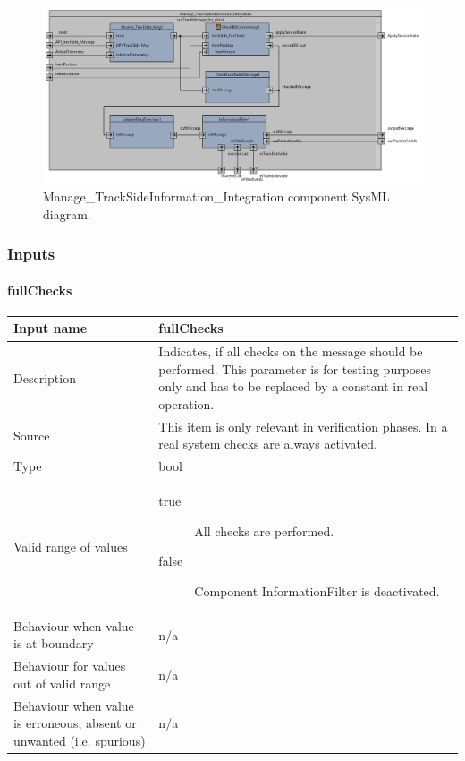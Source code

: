 \begin{figure}[H]
\center
\includegraphics[width=\textwidth]{./images/Figure_1_IBD_Manage_TrackSideInformation_Integration_1.png}
\caption{Manage\_TrackSideInformation\_Integration component SysML diagram.}\label{f:receiveAndCheckConsistencyArch}
\end{figure}


\subsubsection{Inputs}\label{s:Manage_Trackside_inputs}

\paragraph{fullChecks}

\begin{longtable}{p{}p{}}
\toprule
Input name				& fullChecks \\
\midrule
Description				& Indicates, if all checks on the message should be performed. This parameter is for testing purposes only and has to be replaced by a constant in real operation.\\
\midrule
Source					& This item is only relevant in verification phases. In a real system checks are always activated. \\ 
\midrule
Type					& bool \\
\midrule
Valid range of values	& 
\begin{description}
\item[true] All checks are performed.
\item[false] Component InformationFilter is deactivated.
\end{description} \\
\midrule
Behaviour when value is at boundary	& n/a \\
\midrule
Behaviour for values out of valid range	& n/a \\
\midrule
Behaviour when value is erroneous, absent or unwanted (i.e. spurious) & n/a\\
\bottomrule
\end{longtable}


